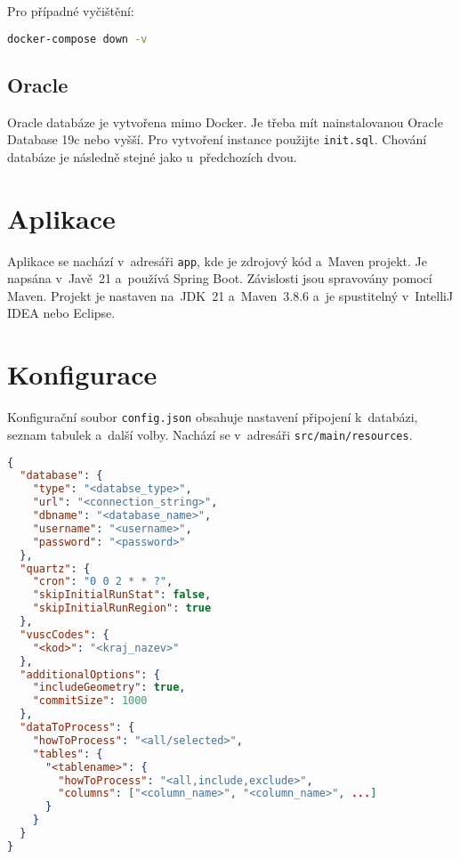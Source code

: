 Pro případné vyčištění:
\begin{lstlisting}[language=bash]
docker-compose down -v
\end{lstlisting}

\subsection*{Oracle}
Oracle databáze je vytvořena mimo Docker. Je třeba mít nainstalovanou Oracle Database 19c nebo vyšší. Pro vytvoření instance použijte \texttt{init.sql}.
Chování databáze je následně stejné jako u~předchozích dvou.

\section*{Aplikace}
Aplikace se nachází v~adresáři \texttt{app}, kde je zdrojový kód a~Maven projekt. Je napsána v~Javě~21 a~používá Spring Boot. Závislosti jsou spravovány pomocí Maven.
Projekt je nastaven na~JDK~21 a~Maven~3.8.6 a~je spustitelný v~IntelliJ IDEA nebo Eclipse.

\section*{Konfigurace}
Konfigurační soubor \texttt{config.json} obsahuje nastavení připojení k~databázi, seznam tabulek a~další volby. Nachází se v~adresáři \texttt{src/main/resources}.

\newpage

\begin{lstlisting}[language=json, caption={Příklad konfiguračního souboru}]
{
  "database": {
    "type": "<databse_type>",
    "url": "<connection_string>",
    "dbname": "<database_name>",
    "username": "<username>",
    "password": "<password>"
  },
  "quartz": {
    "cron": "0 0 2 * * ?",
    "skipInitialRunStat": false,
    "skipInitialRunRegion": true
  },
  "vuscCodes": {
    "<kod>": "<kraj_nazev>"
  },
  "additionalOptions": {
    "includeGeometry": true,
    "commitSize": 1000
  },
  "dataToProcess": {
    "howToProcess": "<all/selected>",
    "tables": {
      "<tablename>": {
        "howToProcess": "<all,include,exclude>",
        "columns": ["<column_name>", "<column_name>", ...]
      }
    }
  }
}
\end{lstlisting}

\newpage

